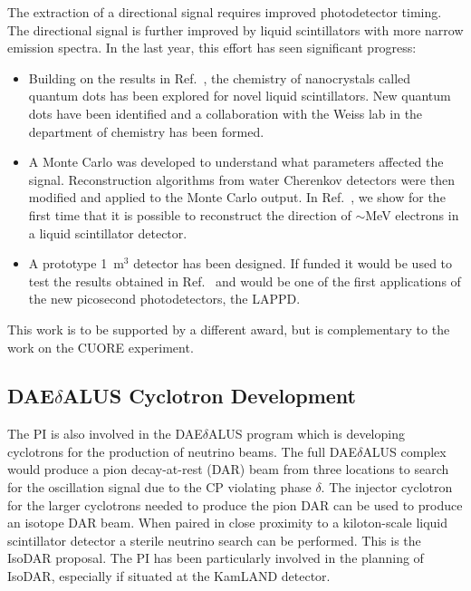 The extraction of a directional signal requires improved photodetector timing. The directional signal is further improved by liquid scintillators with more narrow emission spectra.  In the last year, this effort has seen significant progress:
\begin{itemize}
  \item Building on the results in Ref.~\cite{qdot}, the chemistry of nanocrystals called quantum dots has been explored for novel liquid scintillators\cite{qdot2013}. New quantum dots have been identified and a collaboration with the Weiss lab in the department of chemistry has been formed. 
  \item A Monte Carlo was developed to understand what parameters affected the signal. Reconstruction algorithms from water Cherenkov detectors were then modified and applied to the Monte Carlo output. In Ref.~\cite{direction2013}, we show for the first time that it is possible to reconstruct the direction of $\sim$MeV electrons in a liquid scintillator detector.
  \item A prototype 1~m$^{3}$ detector has been designed. If funded it would be used to test the results obtained in Ref.~\cite{direction2013} and would be one of the first applications of the new picosecond photodetectors, the LAPPD\cite{LAPPDSum,LAPPDTDR}.
\end{itemize}
This work is to be supported by a different award, but is complementary to the work on the CUORE experiment.

\subsection{DAE$\delta$ALUS  Cyclotron Development}

The PI is also involved in the DAE$\delta$ALUS program which is developing cyclotrons for the production of neutrino beams\cite{Alonso:2010fs,daedaluswhite}. The full DAE$\delta$ALUS complex would produce a pion decay-at-rest (DAR) beam from three locations to search for the oscillation signal due to the CP violating phase $\delta$.  The injector cyclotron for the larger cyclotrons needed to produce the pion DAR can be used to produce an isotope DAR beam. When paired in close proximity to a kiloton-scale liquid scintillator detector a sterile neutrino search can be performed. This is the IsoDAR proposal\cite{isodar}. The PI has been particularly involved in the planning of IsoDAR, especially if situated at the KamLAND detector. 

